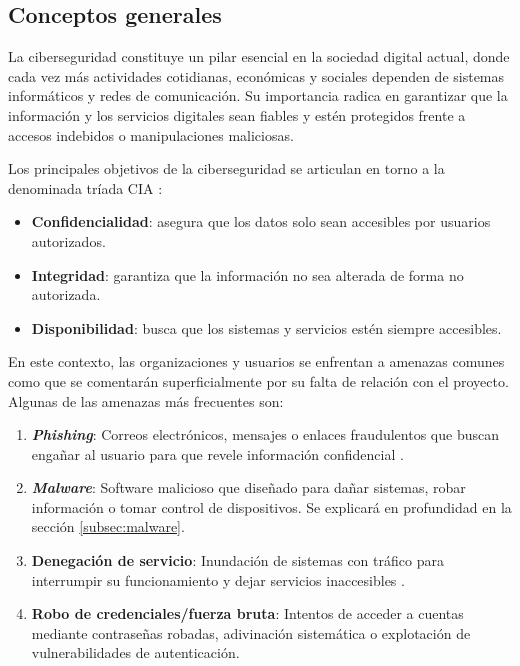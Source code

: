 \subsection{Conceptos generales}
\label{subsec:ciberseguridad_general}

La ciberseguridad constituye un pilar esencial en la sociedad digital actual, donde cada vez más actividades cotidianas, económicas y sociales dependen de sistemas informáticos y redes de comunicación. Su importancia radica en garantizar que la información y los servicios digitales sean fiables y estén protegidos frente a accesos indebidos o manipulaciones maliciosas.

\vspace{1em}

Los principales objetivos de la ciberseguridad se articulan en torno a la denominada tríada CIA \cite{triadacia}:

\begin{itemize}
	\item \textbf{Confidencialidad}: asegura que los datos solo sean accesibles por usuarios autorizados.
	\item \textbf{Integridad}: garantiza que la información no sea alterada de forma no autorizada.
	\item \textbf{Disponibilidad}: busca que los sistemas y servicios estén siempre accesibles.
\end{itemize}

En este contexto, las organizaciones y usuarios se enfrentan a amenazas comunes como que se comentarán superficialmente por su falta de relación con el proyecto. Algunas de las amenazas más frecuentes son:

\begin{enumerate}
	\item \textbf{\textit{Phishing}}: Correos electrónicos, mensajes o enlaces fraudulentos que buscan engañar al usuario para que revele información confidencial \cite{phishing}.
	\item \textbf{\textit{Malware}}: Software malicioso que diseñado para dañar sistemas, robar información o tomar control de dispositivos. Se explicará en profundidad en la sección \ref{subsec:malware}.
	\item \textbf{Denegación de servicio}: Inundación de sistemas con tráfico para interrumpir su funcionamiento y dejar servicios inaccesibles \cite{dos}.
	\item \textbf{Robo de credenciales/fuerza bruta}: Intentos de acceder a cuentas mediante contraseñas robadas, adivinación sistemática o explotación de vulnerabilidades de autenticación.
\end{enumerate}

